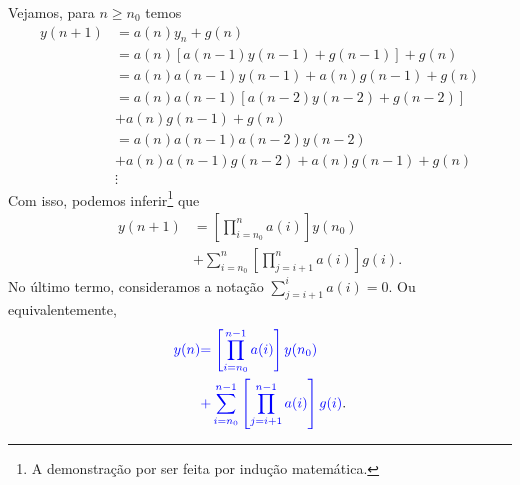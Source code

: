 Vejamos, para $n\geq n_0$ temos
\begin{align*}
  y(n+1) &= a(n)y_n + g(n) \\
         &= a(n)\left[a(n-1)y(n-1)+g(n-1)\right] + g(n) \\
         &= a(n)a(n-1)y(n-1)+a(n)g(n-1) + g(n) \\
         &= a(n)a(n-1)\left[a(n-2)y(n-2)+g(n-2)\right] \\
         &+ a(n)g(n-1) + g(n) \\
         &= a(n)a(n-1)a(n-2)y(n-2) \\
         &+ a(n)a(n-1)g(n-2) + a(n)g(n-1) + g(n) \\
         &\vdots
\end{align*}
Com isso, podemos inferir\footnote{A demonstração por ser feita por indução matemática.} que
\begin{align}
  y(n+1) &= \left[\prod_{i=n_0}^{n} a(i)\right]y(n_0) \\
         &+ \sum_{i=n_0}^n\left[\prod_{j=i+1}^{n} a(i)\right]g(i).
\end{align}
No último termo, consideramos a notação $\sum_{j=i+1}^i a(i) = 0$. Ou equivalentemente,
\begin{align}
  {\color{blue}y(n)} &{\color{blue}= \left[\prod_{i=n_0}^{n-1} a(i)\right]y(n_0)} \nonumber\\
       &{\color{blue}+ \sum_{i=n_0}^{n-1}\left[\prod_{j=i+1}^{n-1} a(i)\right]g(i)}. \label{eq:ead1_linear_eqnh_sol}
\end{align}


